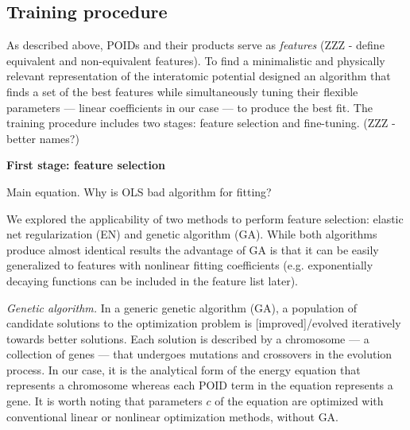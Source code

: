 \documentclass[aps,prl,reprint,amsmath,amssymb,nature]{revtex4-1}
\begin{document}
\subsection{Training procedure} 

As described above, POIDs and their products serve as \textit{features} (ZZZ - define equivalent and non-equivalent features). 
To find a minimalistic and physically relevant representation of the interatomic potential designed an algorithm that finds a set of the best features while simultaneously tuning their flexible parameters --- linear coefficients in our case --- to produce the best fit. 
The training procedure includes two stages: feature selection and fine-tuning. (ZZZ - better names?)

\textbf{First stage: feature selection}

Main equation. Why is OLS bad algorithm for fitting?

We explored the applicability of two methods to perform feature selection: elastic net regularization (EN) and genetic algorithm (GA). 
While both algorithms produce almost identical results the advantage of GA is that it can be easily generalized to features with nonlinear fitting coefficients (e.g. exponentially decaying functions can be included in the feature list later).

\textit{Genetic algorithm.} In a generic genetic algorithm (GA), a population of candidate solutions to the optimization problem is [improved]/evolved iteratively towards better solutions. Each solution is described by a chromosome --- a collection of genes --- that undergoes mutations and crossovers in the evolution process. In our case, it is the analytical form of the energy equation that represents a chromosome whereas each POID term in the equation represents a gene. It is worth noting that parameters $c$ of the equation are optimized with conventional linear or nonlinear optimization methods, without GA.
\end{document}
